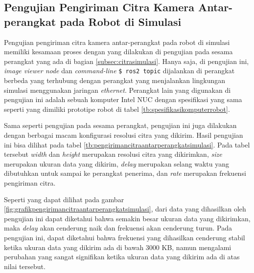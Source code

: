 \subsection{Pengujian Pengiriman Citra Kamera Antar-perangkat pada Robot di Simulasi}
\label{subsec:citraantarperangkatsimulasi}

Pengujian pengiriman citra kamera antar-perangkat pada robot di simulasi memiliki kesamaan proses dengan yang dilakukan di pengujian pada sesama perangkat yang ada di bagian \ref{subsec:citrasimulasi}.
Hanya saja, di pengujian ini, \emph{image viewer node} dan \emph{command-line} \lstinline{$ ros2 topic} dijalankan di perangkat berbeda yang terhubung dengan perangkat yang menjalankan lingkungan simulasi menggunakan jaringan \emph{ethernet}.
Perangkat lain yang digunakan di pengujian ini adalah sebuah komputer Intel NUC dengan spesifikasi yang sama seperti yang dimiliki prototipe robot di tabel \ref{tb:spesifikasikomputerrobot}.



Sama seperti pengujian pada sesama perangkat,
  pengujian ini juga dilakukan dengan berbagai macam konfigurasi resolusi citra yang dikirim.
Hasil pengujian ini bisa dilihat pada tabel \ref{tb:pengirimancitraantarperangkatsimulasi}.
Pada tabel tersebut \emph{width} dan \emph{height} merupakan resolusi citra yang dikirimkan,
  \emph{size} merupakan ukuran data yang dikirim,
  \emph{delay} merupakan selang waktu yang dibutuhkan untuk sampai ke perangkat penerima,
  dan \emph{rate} merupakan frekuensi pengiriman citra.

Seperti yang dapat dilihat pada gambar \ref{fig:grafikpengirimancitraantarperangkatsimulasi},
  dari data yang dihasilkan oleh pengujian ini dapat diketahui bahwa semakin besar ukuran data yang dikirimkan,
  maka \emph{delay} akan cenderung naik dan frekuensi akan cenderung turun.
Pada pengujian ini, dapat diketahui bahwa frekuensi yang dihasilkan cenderung stabil ketika ukuran data yang dikirim ada di bawah 3000 KB,
  namun mengalami perubahan yang sangat signifikan ketika ukuran data yang dikirim ada di atas nilai tersebut.


